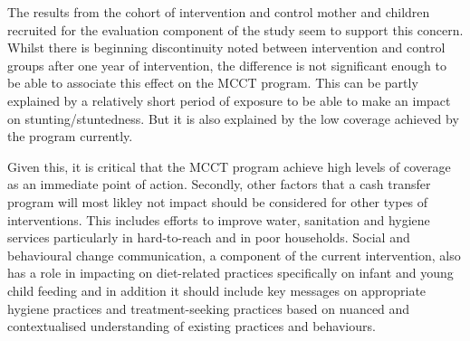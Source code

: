 \documentclass[12pt,a4paper]{article}
\begin{document}
The results from the cohort of intervention and control mother and children recruited for the evaluation component of the study seem to support this concern. Whilst there is beginning discontinuity noted between intervention and control groups after one year of intervention, the difference is not significant enough to be able to associate this effect on the MCCT program. This can be partly explained by a relatively short period of exposure to be able to make an impact on stunting/stuntedness. But it is also explained by the low coverage achieved by the program currently.

Given this, it is critical that the MCCT program achieve high levels of coverage as an immediate point of action. Secondly, other factors that a cash transfer program will most likley not impact should be considered for other types of interventions. This includes efforts to improve water, sanitation and hygiene services particularly in hard-to-reach and in poor households. Social and behavioural change communication, a component of the current intervention, also has a role in impacting on diet-related practices specifically on infant and young child feeding and in addition it should include key messages on appropriate hygiene practices and treatment-seeking practices based on nuanced and contextualised understanding of existing practices and behaviours.

\newpage

\renewcommand\refname{References}

\end{document}
